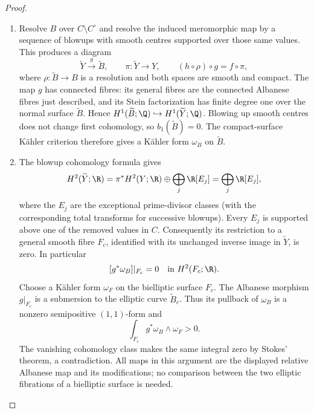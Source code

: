 \begin{proof}
\begin{enumerate}[label={$\langle1\rangle$\arabic*.},leftmargin=*]
\item Resolve $B$ over $C\setminus C^\circ$ and resolve the induced
meromorphic map by a sequence of blowups with smooth centres
supported over those same values. This produces a diagram
\[
 \widetilde Y\xrightarrow{\ g\ }\widetilde B,
 \qquad \pi:\widetilde Y\longrightarrow Y,
 \qquad (h\circ\rho)\circ g=f\circ\pi,
\]
where $\rho:\widetilde B\to B$ is a resolution and both spaces
are smooth and compact. The map $g$ has connected fibres:
its general fibres are the connected Albanese fibres just described,
and its Stein factorization has finite degree one over the normal
surface $\widetilde B$. Hence
$H^1(\widetilde B;\Q)\hookrightarrow H^1(\widetilde Y;\Q)$.
Blowing up smooth centres does not change first cohomology, so
$b_1(\widetilde B)=0$. The compact-surface K\"ahler criterion
\cite[Theorem~1.1]{Peters1990} therefore gives a K\"ahler form
$\omega_B$ on $\widetilde B$.

\item The blowup cohomology formula gives
\[
 H^2(\widetilde Y;\R)
 =\pi^*H^2(Y;\R)\oplus\bigoplus_j\R[E_j]
 =\bigoplus_j\R[E_j],
\]
where the $E_j$ are the exceptional prime-divisor classes (with
the corresponding total transforms for successive blowups).
Every $E_j$ is supported above one of the removed values in $C$.
Consequently its restriction to a general smooth fibre $F_c$,
identified with its unchanged inverse image in $\widetilde Y$,
is zero. In particular
\[
 [g^*\omega_B]|_{F_c}=0\quad\hbox{in }H^2(F_c;\R).
\]
Choose a K\"ahler form $\omega_F$ on the bielliptic surface $F_c$.
The Albanese morphism $g|_{F_c}$ is a submersion to the elliptic
curve $\widetilde B_c$. Thus its pullback of $\omega_B$ is a
nonzero semipositive $(1,1)$-form and
\[
 \int_{F_c}g^*\omega_B\wedge\omega_F>0.
\]
The vanishing cohomology class makes the same integral zero by
Stokes' theorem, a contradiction. All maps in this argument are
the displayed relative Albanese map and its modifications; no
comparison between the two elliptic fibrations of a bielliptic
surface is needed.

\end{enumerate}
\end{proof}